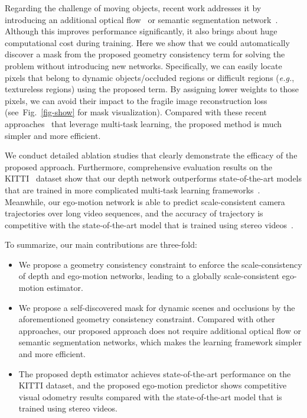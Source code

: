 \documentclass{article}
\newcommand{\figref}[1]{Fig.~\ref{#1}}
\def\eg{\emph{e.g.}}
\begin{document}
Regarding the challenge of moving objects, recent work addresses it by introducing an additional optical flow~\cite{yin2018geonet,zou2018df, ranjan2019cc, wang2018joint}
or semantic segmentation network~\cite{jiao2018look}.
Although this improves performance significantly, it also brings about huge computational cost during training.
Here we show that we could automatically discover a mask from the proposed geometry consistency term for solving the problem without introducing new networks.
Specifically, we can easily locate pixels that belong to dynamic objects/occluded regions or difficult regions (\eg, textureless regions) using the proposed term.
By assigning lower weights to those pixels, we can avoid their impact to the fragile image reconstruction loss (see~\figref{fig-show} for mask visualization).
Compared with these recent approaches~\cite{yin2018geonet, zou2018df,ranjan2019cc} that leverage multi-task learning, the proposed method is much simpler and more efficient.




We conduct detailed ablation studies that clearly demonstrate the efficacy of the proposed approach.
Furthermore, comprehensive evaluation results on the KITTI~\cite{Geiger2013IJRR} dataset show that
our depth network outperforms state-of-the-art models that are trained in more complicated multi-task learning frameworks~\cite{yin2018geonet,zou2018df,ranjan2019cc,Wang2018CVPR}. 
Meanwhile, our ego-motion network is able to predict scale-consistent camera trajectories over long video sequences, and the accuracy of trajectory is competitive
with the state-of-the-art model that is trained using stereo videos~\cite{zhan2018unsupervised}.




To summarize, our main contributions are three-fold:
\begin{itemize}
    \item We propose a geometry consistency constraint to enforce the scale-consistency of depth and ego-motion networks, leading to a globally scale-consistent ego-motion estimator.


    \item We propose a self-discovered mask for dynamic scenes and occlusions by the aforementioned geometry consistency constraint. 
    Compared with other approaches, our proposed approach 
    does not require additional optical flow or semantic segmentation networks, which makes the learning framework simpler and more efficient.
    
    \item The proposed depth estimator achieves state-of-the-art performance on the KITTI dataset, 
    and the proposed ego-motion predictor shows competitive visual odometry results compared with the state-of-the-art model that is trained using stereo videos.


\end{itemize}
\end{document}
